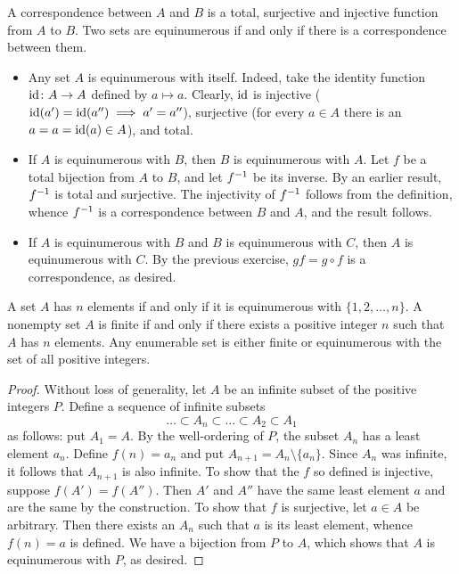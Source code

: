 \begin{exercise}[1.3]
  A correspondence between $A$ and $B$ is a total, surjective and injective function from $A$ to $B$.
  Two sets are equinumerous if and only if there is a correspondence between them.
  \begin{itemize}
    \item Any set $A$ is equinumerous with itself.
    Indeed, take the identity function $\operatorname{id}\colon A \to A$ defined by $a \mapsto a$.
    Clearly, $\operatorname{id}$ is injective ($\operatorname{id}(a') = \operatorname{id}(a'') \implies a' = a''$), surjective (for every $a \in A$ there is an $a = a = \operatorname{id}(a) \in A$), and total.
    \item If $A$ is equinumerous with $B$, then $B$ is equinumerous with $A$.
    Let $f$ be a total bijection from $A$ to $B$, and let $f^{-1}$ be its inverse.
    By an earlier result, $f^{-1}$ is total and surjective.
    The injectivity of $f^{-1}$ follows from the definition, whence $f^{-1}$ is a correspondence between $B$ and $A$, and the result follows.
    \item If $A$ is equinumerous with $B$ and $B$ is equinumerous with $C$, then $A$ is equinumerous with $C$.
    By the previous exercise, $gf = g \circ f$ is a correspondence, as desired.
  \end{itemize}
\end{exercise}

\begin{exercise}[1.4]
  A set $A$ has $n$ elements if and only if it is equinumerous with $\{1,2,\ldots,n\}$.
  A nonempty set $A$ is finite if and only if there exists a positive integer $n$ such that $A$ has $n$ elements.
  Any enumerable set is either finite or equinumerous with the set of all positive integers.
\end{exercise}
\begin{proof}
  Without loss of generality, let $A$ be an infinite subset of the positive integers $P$.
  Define a sequence of infinite subsets
  \begin{equation*}
    \ldots \subset A_n \subset \ldots \subset A_2 \subset A_1
  \end{equation*}
  as follows: put $A_1 = A$.
  By the well-ordering of $P$, the subset $A_n$ has a least element $a_n$.
  Define $f(n) = a_n$ and put $A_{n+1} = A_n \setminus \{a_n\}$.
  Since $A_n$ was infinite, it follows that $A_{n+1}$ is also infinite.
  To show that the $f$ so defined is injective, suppose $f(A') = f(A'')$.
  Then $A'$ and $A''$ have the same least element $a$ and are the same by the construction.
  To show that $f$ is surjective, let $a \in A$ be arbitrary.
  Then there exists an $A_n$ such that $a$ is its least element, whence $f(n) = a$ is defined.
  We have a bijection from $P$ to $A$, which shows that $A$ is equinumerous with $P$, as desired.
\end{proof}

